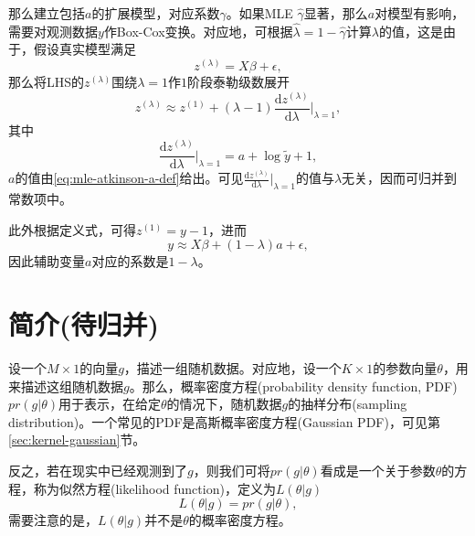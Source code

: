 那么建立包括$a$的扩展模型，对应系数$\gamma$。如果MLE $\hat{\gamma}$显著，那么$a$对模型有影响，需要对观测数据$y$作Box-Cox变换。对应地，可根据$\hat{\lambda} = 1 - \hat{\gamma}$计算$\lambda$的值，这是由于，假设真实模型满足
\begin{equation*}
  z^{\left( \lambda \right)} = X \beta + \epsilon,
\end{equation*}
那么将LHS的$z^{\left( \lambda \right)}$围绕$\lambda = 1$作$1$阶段泰勒级数展开
\begin{equation*}
  z^{\left( \lambda \right)} \approx z^{ \left( 1 \right)} + \left( \lambda - 1 \right) \frac{\mathrm{d} z^{\left( \lambda \right)}}{\mathrm{d} \lambda} \Big|_{\lambda=1},
\end{equation*}
其中
\begin{equation*}
  \frac{\mathrm{d} z^{\left( \lambda \right)}}{\mathrm{d} \lambda} \Big|_{\lambda=1} = a + \log \tilde{y} + 1 ,
\end{equation*}
$a$的值由\eqref{eq:mle-atkinson-a-def}给出。可见$\frac{\mathrm{d} z^{\left( \lambda \right)}}{\mathrm{d} \lambda} \big|_{\lambda=1}$的值与$\lambda$无关，因而可归并到常数项中。

此外根据定义式，可得$z^{(1)}=y-1$，进而
\begin{equation*}
y \approx X \beta + \left( 1 - \lambda \right) a + \epsilon,
\end{equation*}
因此辅助变量$a$对应的系数是$1 - \lambda$。



\section{简介(待归并)}
\label{sec:mle-intro}
设一个$M \times 1$的向量$g$，描述一组随机数据。对应地，设一个$K \times 1$的参数向量$\theta$，用来描述这组随机数据$g$。那么，概率密度方程(probability density function, PDF) $pr(g|\theta)$用于表示，在给定$\theta$的情况下，随机数据$g$的抽样分布(sampling distribution)。一个常见的PDF是高斯概率密度方程(Gaussian PDF)，可见第\ref{sec:kernel-gaussian}节。

反之，若在现实中已经观测到了$g$，则我们可将$pr(g|\theta)$看成是一个关于参数$\theta$的方程，称为似然方程(likelihood function)，定义为$L(\theta | g)$
\begin{equation*}
  L(\theta | g) = pr(g | \theta),
\end{equation*}
需要注意的是，$L(\theta | g)$并不是$\theta$的概率密度方程。

